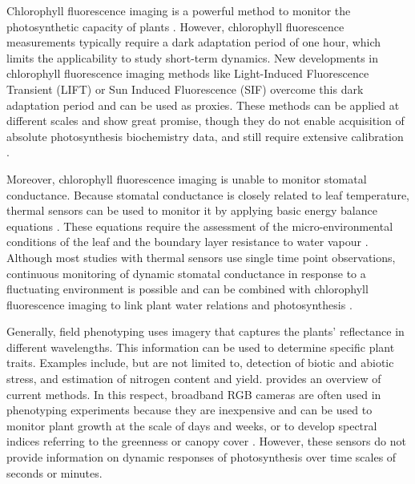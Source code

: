 \documentclass[10pt,authoryear,a4paper,review]{elsarticle}
\begin{document}
    Chlorophyll fluorescence imaging is a powerful method to monitor the photosynthetic capacity of plants \citep{bakerChlorophyll2008,murchieChlorophyll2013}. However, chlorophyll fluorescence measurements typically require a dark adaptation period of one hour, which limits the applicability to study short-term dynamics. New developments in chlorophyll fluorescence imaging methods like Light-Induced Fluorescence Transient (LIFT) or Sun Induced Fluorescence (SIF) overcome this dark adaptation period and can be used as proxies. These methods can be applied at different scales and show great promise, though they do not enable acquisition of absolute photosynthesis biochemistry data, and still require extensive calibration \citep{murchieDynamic2020,bandopadhyayReview2020}.
 
    Moreover, chlorophyll fluorescence imaging is unable to monitor stomatal conductance. Because stomatal conductance is closely related to leaf temperature, thermal sensors can be used to monitor it by applying basic energy balance equations \citep{jonesIrrigation2004,maesEstimating2012}. These equations require the assessment of the micro-environmental conditions of the leaf and the boundary layer resistance to water vapour \citep{jonesUse2002}. Although most studies with thermal sensors use single time point observations, continuous monitoring of dynamic stomatal conductance in response to a fluctuating environment is possible and can be combined with chlorophyll fluorescence imaging to link plant water relations and photosynthesis \citep{mcauslandEffects2016}. 
 
    Generally, field phenotyping uses imagery that captures the plants' reflectance in different wavelengths. This information can be used to determine specific plant traits. Examples include, but are not limited to, detection of biotic and abiotic stress, and estimation of nitrogen content and yield. \citet{mirHighthroughput2019} provides an overview of current methods. In this respect, broadband RGB cameras are often used in phenotyping experiments because they are inexpensive and can be used to monitor plant growth at the scale of days and weeks, or to develop spectral indices referring to the greenness or canopy cover \citep{borra-serranoClosing2020}. However, these sensors do not provide information on dynamic responses of photosynthesis over time scales of seconds or minutes.
 
\end{document}

